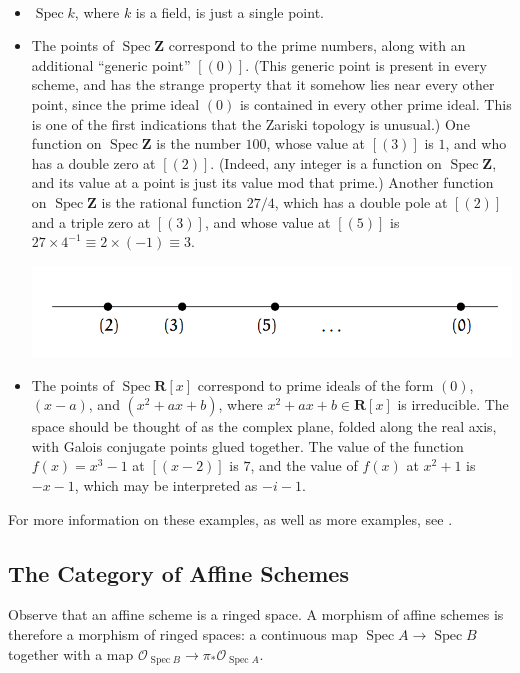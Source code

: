 \documentclass[11pt,openany]{book} %
\newcommand{\R}{\mathbf{R}}
\newcommand{\Z}{\mathbf{Z}}
\newcommand{\spc}{\operatorname{Spec}}
\begin{document}
\begin{example}\
\begin{itemize}
	\item $\spc k$, where $k$ is a field, is just a single point.
    
    \item The points of $\spc \Z$ correspond to the prime numbers, along with an additional ``generic point'' $[(0)]$. (This generic point is present in every scheme, and has the strange property that it somehow lies near every other point, since the prime ideal $(0)$ is contained in every other prime ideal. This is one of the first indications that the Zariski topology is unusual.) One function on $\spc \Z$ is the number $100$, whose value at $[(3)]$ is $1$, and who has a double zero at $[(2)]$. (Indeed, any integer is a function on $\spc \Z$, and its value at a point is just its value mod that prime.) Another function on $\spc \Z$ is the rational function $27/4$, which has a double pole at $[(2)]$ and a triple zero at $[(3)]$, and whose value at $[(5)]$ is $27\times4^{-1} \equiv 2 \times (-1) \equiv 3$.
    \begin{center}
    \includegraphics[scale=0.7]{specz}
    \end{center}
   
   \item The points of $\spc \R[x]$ correspond to prime ideals of the form $(0)$, $(x - a)$, and $(x^2 + ax + b)$, where $x^2 + ax + b \in \R[x]$ is irreducible. The space should be thought of as the complex plane, folded along the real axis, with Galois conjugate points glued together. The value of the function $f(x) = x^3 - 1$ at $[(x - 2)]$ is $7$, and the value of $f(x)$ at $x^2 + 1$ is $-x - 1$, which may be interpreted as $-i - 1$.
\end{itemize}
For more information on these examples, as well as more examples, see \cite{vakil}.
\end{example}


\subsection{The Category of Affine Schemes} \label{affschcat}
Observe that an affine scheme is a ringed space. A morphism of affine schemes is therefore a morphism of ringed spaces: a continuous map $\spc A \to \spc B$ together with a map $\mathcal{O}_{\spc B} \to \pi_*\mathcal{O}_{\spc A}$.\\
\end{document}

